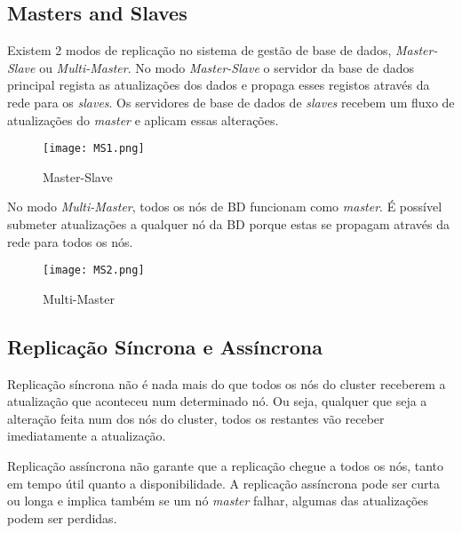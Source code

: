 \subsection{Masters and Slaves}

Existem 2 modos de replicação no sistema de gestão de base de dados, \textit{Master-Slave} ou \textit{Multi-Master}. 
No modo \textit{Master-Slave} o servidor da base de dados principal regista as atualizações dos dados e propaga esses registos através da rede para os \textit{slaves}. Os servidores de base de dados de \textit{slaves} recebem um fluxo de atualizações do \textit{master} e aplicam essas alterações.

\begin{figure}[H]
\center
\texttt{[image: MS1.png]}
\caption{Master-Slave}
\end{figure}

No modo \textit{Multi-Master}, todos os nós de \ac{BD} funcionam como \textit{master}. É possível submeter atualizações a qualquer nó da \ac{BD} porque estas se propagam através da rede para todos os nós.

\begin{figure}[H]
\center
\texttt{[image: MS2.png]}
\caption{Multi-Master}
\end{figure}

\subsection{Replicação Síncrona e Assíncrona}

Replicação síncrona não é nada mais do que todos os nós do cluster receberem a atualização que aconteceu num determinado nó. Ou seja, qualquer que seja a alteração feita num dos nós do cluster, todos os restantes vão receber imediatamente a atualização.

Replicação assíncrona não garante que a replicação chegue a todos os nós, tanto em tempo útil quanto a disponibilidade. A replicação assíncrona pode ser curta ou longa e implica também se um nó \textit{master} falhar, algumas das atualizações podem ser perdidas.